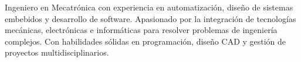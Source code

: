 
\begin{cvparagraph}
  Ingeniero en Mecatrónica con experiencia en automatización, diseño de sistemas embebidos y desarrollo de software. Apasionado por la integración de tecnologías mecánicas, electrónicas e informáticas para resolver problemas de ingeniería complejos. Con habilidades sólidas en programación, diseño CAD y gestión de proyectos multidisciplinarios.
\end{cvparagraph}
